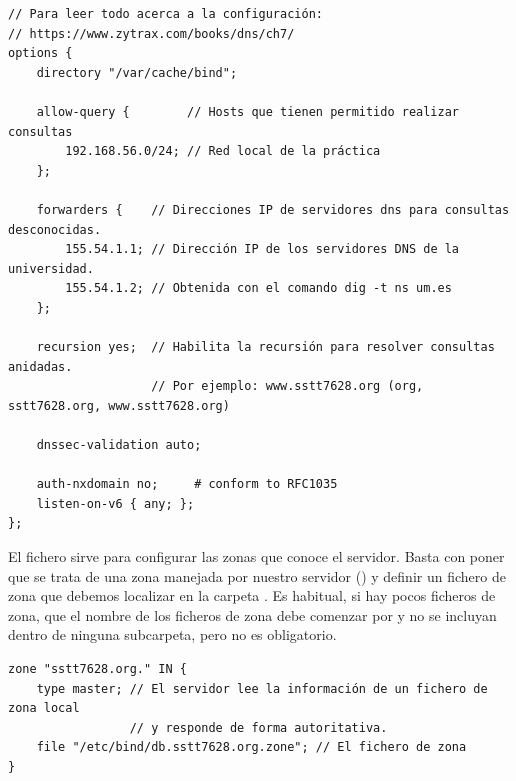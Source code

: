 \begin{lstlisting}[title=Fichero \file{/etc/bind/named.conf.options}]
// Para leer todo acerca a la configuración:
// https://www.zytrax.com/books/dns/ch7/
options {
    directory "/var/cache/bind";

    allow-query {        // Hosts que tienen permitido realizar consultas
    	192.168.56.0/24; // Red local de la práctica
    };

    forwarders {    // Direcciones IP de servidores dns para consultas desconocidas.
    	155.54.1.1; // Dirección IP de los servidores DNS de la universidad.
    	155.54.1.2; // Obtenida con el comando dig -t ns um.es
    };

    recursion yes;  // Habilita la recursión para resolver consultas anidadas.
                    // Por ejemplo: www.sstt7628.org (org, sstt7628.org, www.sstt7628.org)

    dnssec-validation auto;

    auth-nxdomain no;     # conform to RFC1035
    listen-on-v6 { any; };
};
\end{lstlisting}

El fichero  sirve para configurar las zonas que conoce el servidor. Basta con poner que se trata de una zona manejada por nuestro servidor () y definir un fichero de zona que debemos localizar en la carpeta . Es habitual, si hay pocos ficheros de zona, que el nombre de los ficheros de zona debe comenzar por  y no se incluyan dentro de ninguna subcarpeta, pero no es obligatorio.

\begin{lstlisting}[title=Fichero \file{/etc/bind/named.conf.local}]
zone "sstt7628.org." IN {
    type master; // El servidor lee la información de un fichero de zona local
                 // y responde de forma autoritativa.
    file "/etc/bind/db.sstt7628.org.zone"; // El fichero de zona
}
\end{lstlisting}

